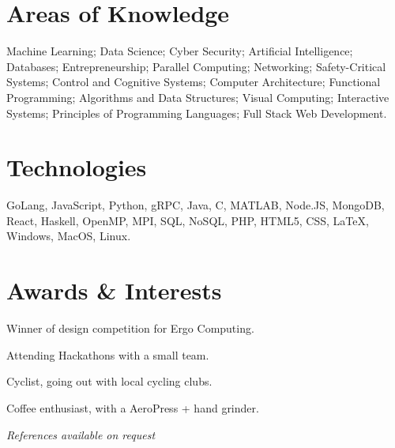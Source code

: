 \documentclass[11pt,a4paper]{report}
\begin{document}
\hfill
\begin{minipage}{0.475\textwidth}
	\section*{\normalfont Areas of Knowledge}
		Machine Learning;
		Data Science;
		Cyber Security;
		Artificial Intelligence;
		Databases;
		Entrepreneurship;
		Parallel Computing;
		Networking;
		Safety-Critical Systems;
		Control and Cognitive Systems;
		Computer Architecture;
		Functional Programming;
		Algorithms and Data Structures;
		Visual Computing;
		Interactive Systems;
		Principles of Programming Languages;
		Full Stack Web Development.
		
	\vspace{-0.9mm}

	\section*{\normalfont Technologies}
		GoLang,
		JavaScript,
		Python,
		gRPC,
		Java,
		C,
		MATLAB,
		Node.JS,
		MongoDB,
		React,
		Haskell,
		OpenMP,
		MPI,
		SQL,
		NoSQL,
		PHP,
		HTML5,
		CSS,
		\LaTeX,
		Windows,
		MacOS,
		Linux.
	\section*{\normalfont Awards \& Interests}
	Winner of design competition for Ergo Computing.

	Attending Hackathons with a small team.

	Cyclist, going out with local cycling clubs.

	Coffee enthusiast, with a AeroPress + hand grinder.
\end{minipage}
\vfill
\emph{References available on request}
\end{document}
